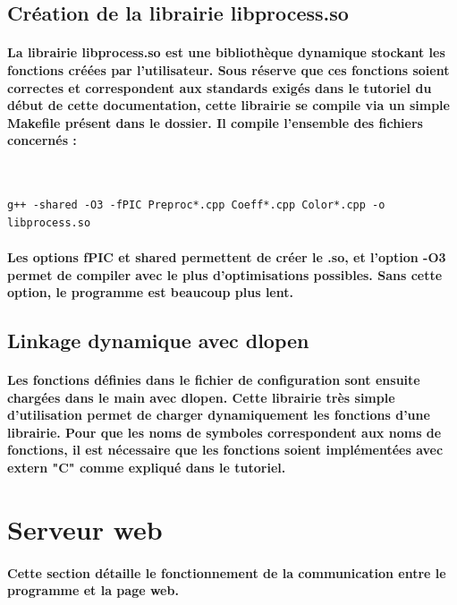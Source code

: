\documentclass[a4paper]{article}
\begin{document}
\subsection{Création de la librairie libprocess.so} \paragraph{La librairie
libprocess.so est une bibliothèque dynamique stockant les fonctions créées par
l’utilisateur. Sous réserve que ces fonctions soient correctes et correspondent
aux standards exigés dans le tutoriel du début de cette documentation, cette
librairie se compile via un simple Makefile présent dans le dossier. Il compile
l’ensemble des fichiers concernés :} \

\begin{lstlisting}
g++ -shared -O3 -fPIC Preproc*.cpp Coeff*.cpp Color*.cpp -o libprocess.so
\end{lstlisting}

\paragraph{Les options fPIC et shared permettent de créer le .so, et l’option
-O3 permet de compiler avec le plus d’optimisations possibles. Sans cette
option, le programme est beaucoup plus lent.}

\subsection{Linkage dynamique avec dlopen} \paragraph{Les fonctions définies
dans le fichier de configuration sont ensuite chargées dans le main avec dlopen.
Cette librairie très simple d’utilisation permet de charger dynamiquement les
fonctions d’une librairie. Pour que les noms de symboles correspondent aux noms
de fonctions, il est nécessaire que les fonctions soient implémentées avec
extern "C" comme expliqué dans le tutoriel.}

\section{Serveur web} \paragraph{Cette section détaille le fonctionnement de la
communication entre le programme et la page web.}
\end{document}
